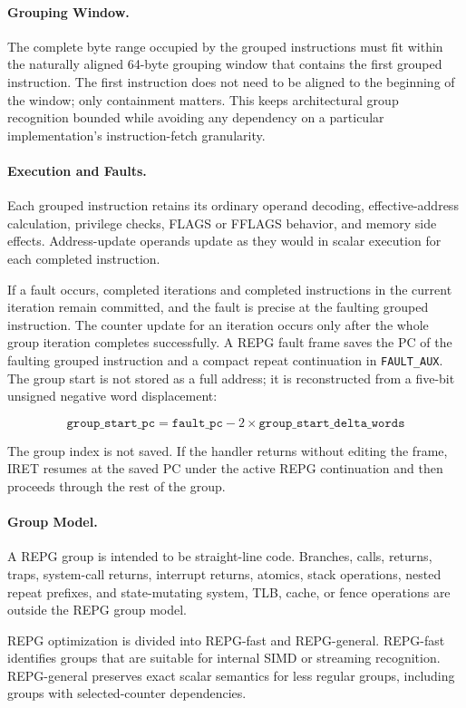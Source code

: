 \paragraph{Grouping Window.}
The complete byte range occupied by the grouped instructions must fit within the
naturally aligned 64-byte grouping window that contains the first grouped
instruction. The first instruction does not need to be aligned to the beginning
of the window; only containment matters. This keeps architectural group
recognition bounded while avoiding any dependency on a particular
implementation's instruction-fetch granularity.

\paragraph{Execution and Faults.}
Each grouped instruction retains its ordinary operand decoding,
effective-address calculation, privilege checks, FLAGS or FFLAGS behavior, and
memory side effects. Address-update operands update as they would in scalar
execution for each completed instruction.

If a fault occurs, completed iterations and completed instructions in the
current iteration remain committed, and the fault is precise at the faulting
grouped instruction. The counter update for an iteration occurs only after the
whole group iteration completes successfully. A REPG fault frame saves the PC of
the faulting grouped instruction and a compact repeat continuation in
\texttt{FAULT\_AUX}. The group start is not stored as a full address; it is
reconstructed from a five-bit unsigned negative word displacement:

\[
  \texttt{group\_start\_pc}
  =
  \texttt{fault\_pc}
  -
  2 \times \texttt{group\_start\_delta\_words}
\]

The group index is not saved. If the handler returns without editing the frame,
IRET resumes at the saved PC under the active REPG continuation and then
proceeds through the rest of the group.

\paragraph{Group Model.}
A REPG group is intended to be straight-line code. Branches, calls, returns,
traps, system-call returns, interrupt returns, atomics, stack operations,
nested repeat prefixes, and state-mutating system, TLB, cache, or fence
operations are outside the REPG group model.

REPG optimization is divided into REPG-fast and REPG-general. REPG-fast
identifies groups that are suitable for internal SIMD or streaming recognition.
REPG-general preserves exact scalar semantics for less regular groups, including
groups with selected-counter dependencies.

